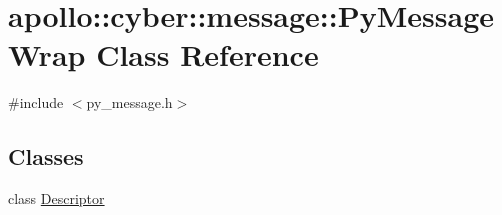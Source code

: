 \hypertarget{classapollo_1_1cyber_1_1message_1_1PyMessageWrap}{\section{apollo\-:\-:cyber\-:\-:message\-:\-:Py\-Message\-Wrap Class Reference}
\label{classapollo_1_1cyber_1_1message_1_1PyMessageWrap}
}


{\ttfamily \#include $<$py\-\_\-message.\-h$>$}

\subsection*{Classes}
\begin{DoxyCompactItemize}
\item 
class \hyperlink{classapollo_1_1cyber_1_1message_1_1PyMessageWrap_1_1Descriptor}{Descriptor}
\end{DoxyCompactItemize}
